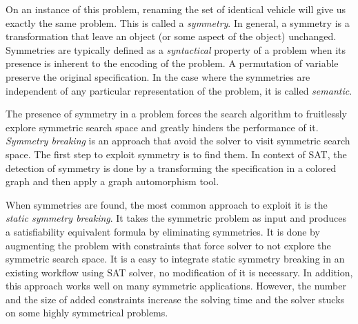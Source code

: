 On an instance of this problem, renaming the set of identical vehicle will give us exactly the same problem.
This is called a \textit{symmetry}. In general, a symmetry is a transformation that leave an object (or some aspect of the object) unchanged. Symmetries are typically defined as a \textit{syntactical} property of a problem when its presence is inherent to the encoding of the problem. A permutation of variable preserve the original specification. In the case where the symmetries are independent of any 
particular representation of the problem, it is called \textit{semantic}.


The presence of symmetry in a problem forces the search algorithm to fruitlessly explore symmetric
search space and greatly hinders the performance of it. \textit{Symmetry breaking} is an approach that
avoid the solver to visit symmetric search space. The first step to exploit symmetry is to find them.
In context of SAT, the detection of symmetry is done by a transforming the specification
in a colored graph and then apply a graph automorphism tool.





%
%
%
%
%
%
%
%
%



When symmetries are found, the most common approach to exploit it is the \emph{static symmetry breaking}.
It takes the symmetric problem as input and produces a satisfiability equivalent formula by eliminating symmetries. It is done by augmenting the problem with constraints that force solver to not explore the symmetric search  space. It is a easy to integrate static symmetry breaking in an existing workflow using SAT solver, no modification of it is necessary. In addition, this approach works well on many symmetric applications.
However, the number and the size of added constraints increase the solving time and the solver stucks
on some highly symmetrical problems.


